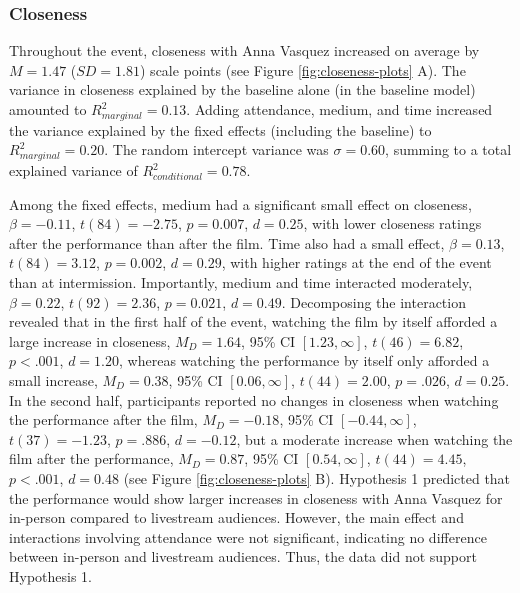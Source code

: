 \documentclass[
  man,floatsintext]{apa6}
\begin{document}
\subsubsection{Closeness}\label{closeness}

Throughout the event, closeness with Anna Vasquez increased on average by \(M = 1.47\) (\(SD = 1.81\)) scale points (see Figure \ref{fig:closeness-plots} A). The variance in closeness explained by the baseline alone (in the baseline model) amounted to \(R_{marginal}^2 = 0.13\). Adding attendance, medium, and time increased the variance explained by the fixed effects (including the baseline) to \(R_{marginal}^2 = 0.20\). The random intercept variance was \(\sigma = 0.60\), summing to a total explained variance of \(R_{conditional}^2 = 0.78\).

Among the fixed effects, medium had a significant small effect on closeness, \(\beta = -0.11\), \(t (84) = -2.75\), \(p = 0.007\), \(d = 0.25\), with lower closeness ratings after the performance than after the film. Time also had a small effect, \(\beta = 0.13\), \(t (84) = 3.12\), \(p = 0.002\), \(d = 0.29\), with higher ratings at the end of the event than at intermission. Importantly, medium and time interacted moderately, \(\beta = 0.22\), \(t (92) = 2.36\), \(p = 0.021\), \(d = 0.49\). Decomposing the interaction revealed that in the first half of the event, watching the film by itself afforded a large increase in closeness, \(M_D = 1.64\), 95\% CI \([1.23, \infty]\), \(t(46) = 6.82\), \(p < .001\), \(d = 1.20\), whereas watching the performance by itself only afforded a small increase, \(M_D = 0.38\), 95\% CI \([0.06, \infty]\), \(t(44) = 2.00\), \(p = .026\), \(d = 0.25\). In the second half, participants reported no changes in closeness when watching the performance after the film, \(M_D = -0.18\), 95\% CI \([-0.44, \infty]\), \(t(37) = -1.23\), \(p = .886\), \(d = -0.12\), but a moderate increase when watching the film after the performance, \(M_D = 0.87\), 95\% CI \([0.54, \infty]\), \(t(44) = 4.45\), \(p < .001\), \(d = 0.48\) (see Figure \ref{fig:closeness-plots} B). Hypothesis 1 predicted that the performance would show larger increases in closeness with Anna Vasquez for in-person compared to livestream audiences. However, the main effect and interactions involving attendance were not significant, indicating no difference between in-person and livestream audiences. Thus, the data did not support Hypothesis 1.
\end{document}
